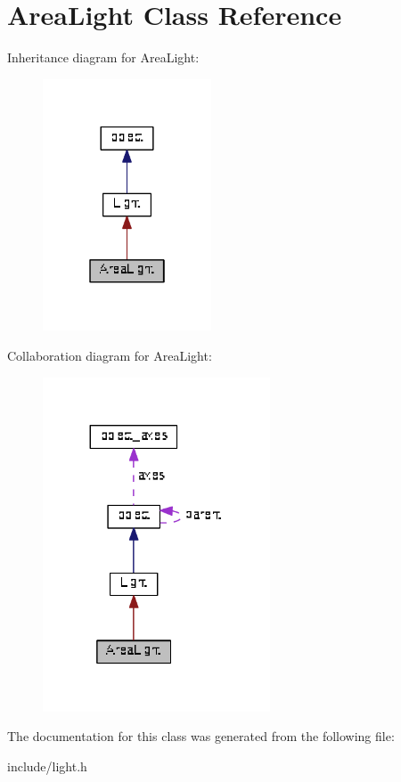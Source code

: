 \hypertarget{classAreaLight}{}\section{Area\+Light Class Reference}
\label{classAreaLight}


Inheritance diagram for Area\+Light\+:\nopagebreak
\begin{figure}[H]
\begin{center}
\leavevmode
\includegraphics[width=142pt]{classAreaLight__inherit__graph}
\end{center}
\end{figure}


Collaboration diagram for Area\+Light\+:\nopagebreak
\begin{figure}[H]
\begin{center}
\leavevmode
\includegraphics[width=191pt]{classAreaLight__coll__graph}
\end{center}
\end{figure}


The documentation for this class was generated from the following file\+:\begin{DoxyCompactItemize}
\item 
include/light.\+h\end{DoxyCompactItemize}
